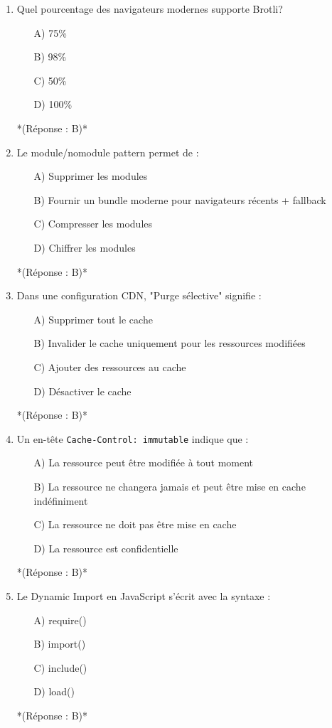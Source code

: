 \documentclass[12pt,a4paper,twoside]{report}
\begin{document}
\begin{enumerate}
\item Quel pourcentage des navigateurs modernes supporte Brotli?
\begin{itemize}
\item[A)] 75\%
\item[B)] 98\%
\item[C)] 50\%
\item[D)] 100\%
\end{itemize}
*(Réponse : B)*

\item Le module/nomodule pattern permet de :
\begin{itemize}
\item[A)] Supprimer les modules
\item[B)] Fournir un bundle moderne pour navigateurs récents + fallback
\item[C)] Compresser les modules
\item[D)] Chiffrer les modules
\end{itemize}
*(Réponse : B)*

\item Dans une configuration CDN, "Purge sélective" signifie :
\begin{itemize}
\item[A)] Supprimer tout le cache
\item[B)] Invalider le cache uniquement pour les ressources modifiées
\item[C)] Ajouter des ressources au cache
\item[D)] Désactiver le cache
\end{itemize}
*(Réponse : B)*

\item Un en-tête \texttt{Cache-Control: immutable} indique que :
\begin{itemize}
\item[A)] La ressource peut être modifiée à tout moment
\item[B)] La ressource ne changera jamais et peut être mise en cache indéfiniment
\item[C)] La ressource ne doit pas être mise en cache
\item[D)] La ressource est confidentielle
\end{itemize}
*(Réponse : B)*

\item Le Dynamic Import en JavaScript s'écrit avec la syntaxe :
\begin{itemize}
\item[A)] require()
\item[B)] import()
\item[C)] include()
\item[D)] load()
\end{itemize}
*(Réponse : B)*


\end{enumerate}
\end{document}
